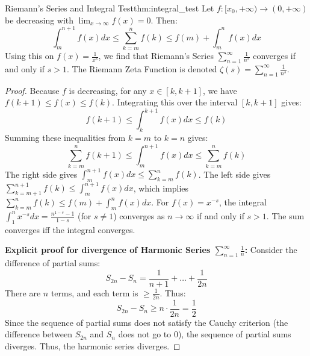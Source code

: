 \documentclass[11pt, a4paper]{article}
\begin{document}
\begin{theorem}{Riemann's Series and Integral Test}{thm:integral_test}
Let $f: [x_0, +\infty) \to (0, +\infty)$ be decreasing with $\lim_{x \to \infty} f(x) = 0$. Then:
$$ \int_m^{n+1} f(x) dx \le \sum_{k=m}^n f(k) \le f(m) + \int_m^n f(x) dx $$
Using this on $f(x) = \frac{1}{x^s}$, we find that Riemann's Series $\sum_{n=1}^\infty \frac{1}{n^s}$ converges if and only if $s > 1$. The Riemann Zeta Function is denoted $\zeta(s) = \sum_{n=1}^\infty \frac{1}{n^s}$.
\end{theorem}
\begin{proof}
Because $f$ is decreasing, for any $x \in [k, k+1]$, we have $f(k+1) \le f(x) \le f(k)$.
Integrating this over the interval $[k, k+1]$ gives:
$$ f(k+1) \le \int_k^{k+1} f(x) dx \le f(k) $$
Summing these inequalities from $k=m$ to $k=n$ gives:
$$ \sum_{k=m}^n f(k+1) \le \int_m^{n+1} f(x) dx \le \sum_{k=m}^n f(k) $$
The right side gives $\int_m^{n+1} f(x) dx \le \sum_{k=m}^n f(k)$. The left side gives $\sum_{k=m+1}^{n+1} f(k) \le \int_m^{n+1} f(x) dx$, which implies $\sum_{k=m}^n f(k) \le f(m) + \int_m^n f(x) dx$.
For $f(x) = x^{-s}$, the integral $\int_1^n x^{-s} dx = \frac{n^{1-s} - 1}{1-s}$ (for $s \neq 1$) converges as $n \to \infty$ if and only if $s > 1$. The sum converges iff the integral converges.

\textbf{Explicit proof for divergence of Harmonic Series $\sum_{n=1}^\infty \frac{1}{n}$:}
Consider the difference of partial sums:
$$ S_{2n} - S_n = \frac{1}{n+1} + \dots + \frac{1}{2n} $$
There are $n$ terms, and each term is $\ge \frac{1}{2n}$. Thus:
$$ S_{2n} - S_n \ge n \cdot \frac{1}{2n} = \frac{1}{2} $$
Since the sequence of partial sums does not satisfy the Cauchy criterion (the difference between $S_{2n}$ and $S_n$ does not go to 0), the sequence of partial sums diverges. Thus, the harmonic series diverges.
\end{proof}
\end{document}
